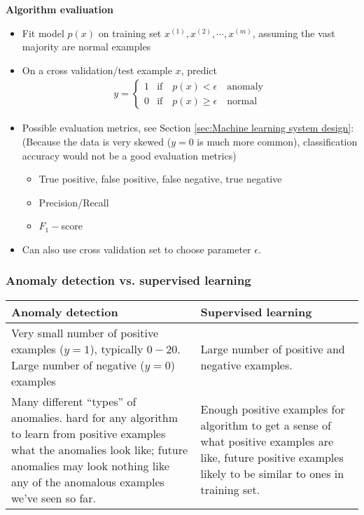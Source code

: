 \textbf{Algorithm evaliuation}
\begin{itemize}
\item[]
    Fit model $p(x)$ on training set $x^{(1)}, x^{(2)}, \cdots, x^{(m)}$, assuming the vast majority are normal examples
\item[]
    On a cross validation/test example $x$, predict
    \begin{align*}
    y = \left\{ \begin{array}{rll}
             1 & \text{if} \quad p(x) < \epsilon \quad \text{anomaly}\\
             0 & \text{if} \quad p(x) \geq \epsilon \quad \text{normal}
                    \end{array}\right.
    \end{align*}
\item[]
    Possible evaluation metrics, see Section \ref{sec:Machine learning system design}:\\
    (Because the data is very skewed ($y = 0$ is much more common), classification accuracy would not be a good evaluation metrics)
    \begin{itemize}
    \item
    True positive, false positive, false negative, true negative
    \item
    Precision/Recall
    \item
    $F_1-$score
    \end{itemize}
\item[]
    Can also use cross validation set to choose parameter $\epsilon$.
\end{itemize}

\subsubsection{Anomaly detection vs. supervised learning}

\begin{center}
\begin{tabular}{| m{7cm} | m{7cm} | }
\hline
Anomaly detection & Supervised learning\\
\hline
Very small number of positive examples ($y = 1$), typically $0-20$. Large number of negative ($y = 0$) examples & Large number of positive and negative examples.\\
\hline
Many different ``types'' of anomalies. hard for any algorithm to learn from positive examples what the anomalies look like;
future anomalies may look nothing like any of the anomalous examples we've seen so far. & Enough positive examples for algorithm to get a sense of what positive examples are like, future positive examples likely to be similar to ones in training set.\\
\hline
\end{tabular}
\end{center}

